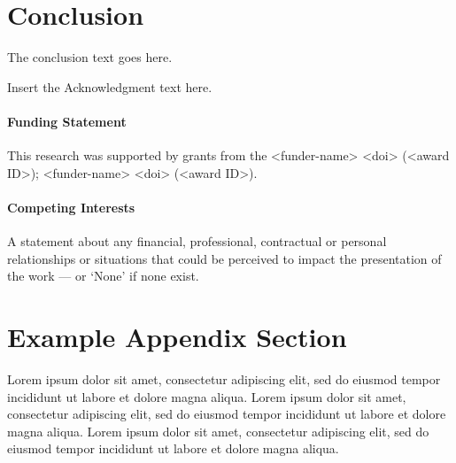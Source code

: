 \documentclass[
  journal=medium,
  manuscript=Qualcomm-Innovation-Fellowship-Proposal,
  year=22-February-2023,
]{cup-journal}
\begin{document}
\section{Conclusion}
The conclusion text goes here.


\begin{acknowledgement}
Insert the Acknowledgment text here.
\end{acknowledgement}

\paragraph{Funding Statement}

This research was supported by grants from the <funder-name> <doi> (<award ID>); <funder-name> <doi> (<award ID>).

\paragraph{Competing Interests}

A statement about any financial, professional, contractual or personal relationships or situations that could be perceived to impact the presentation of the work --- or `None' if none exist.


\printendnotes

\printbibliography

\appendix

\section{Example Appendix Section}

Lorem ipsum dolor sit amet, consectetur adipiscing elit, sed do eiusmod tempor incididunt ut labore et dolore magna aliqua. Lorem ipsum dolor sit amet, consectetur adipiscing elit, sed do eiusmod tempor incididunt ut labore et dolore magna aliqua. Lorem ipsum dolor sit amet, consectetur adipiscing elit, sed do eiusmod tempor incididunt ut labore et dolore magna aliqua. 
\end{document}
